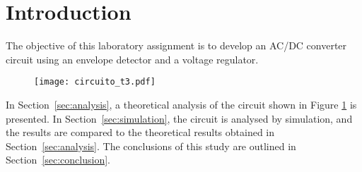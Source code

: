 \section{Introduction}
\label{sec:introduction}

The objective of this laboratory assignment is to develop an AC/DC converter circuit using an envelope detector and a voltage regulator.

\begin{figure}[h]
\centering
  \texttt{[image: circuito\_t3.pdf]}
  \label{fig:circuito_t3}
\end{figure}

In Section~\ref{sec:analysis}, a theoretical analysis of the circuit shown in Figure \ref{fig:circuito_t3}  is
presented. In Section~\ref{sec:simulation}, the circuit is analysed by
simulation, and the results are compared to the theoretical results obtained in
Section~\ref{sec:analysis}. The conclusions of this study are outlined in
Section~\ref{sec:conclusion}.
